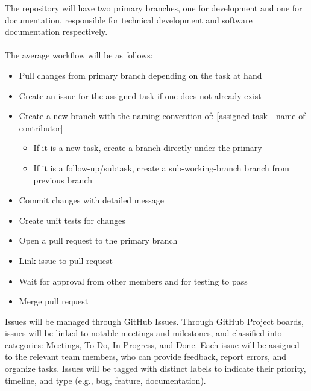 \documentclass{article}
\begin{document}
The repository will have two primary branches, one for development and one for documentation, responsible for technical development and software documentation respectively.
\\\\
The average workflow will be as follows: \\
\begin{itemize}
  \item Pull changes from primary branch depending on the task at hand
  \item Create an issue for the assigned task if one does not already exist
  \item Create a new branch with the naming convention of: [assigned task - name of contributor]
  \begin{itemize}
    \item If it is a new task, create a branch directly under the primary
    \item If it is a follow-up/subtask, create a sub-working-branch branch from previous branch
  \end{itemize}
  \item Commit changes with detailed message
  \item Create unit tests for changes
  \item Open a pull request to the primary branch
  \item Link issue to pull request
  \item Wait for approval from other members and for testing to pass
  \item Merge pull request
\end{itemize}

Issues will be managed through GitHub Issues. Through GitHub Project boards, issues will be linked to notable meetings and milestones, and classified into categories: Meetings, To Do, In Progress, and Done. Each issue will be assigned to the relevant team members, who can provide feedback, report errors, and organize tasks. Issues will be tagged with distinct labels to indicate their priority, timeline, and type (e.g., bug, feature, documentation).
\\
\end{document}

